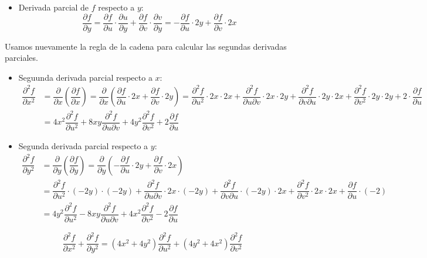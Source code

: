 \begin{enumerate}[label=\color{red}\textbf{\arabic*)}, leftmargin=*]
\begin{itemize}
	\item Derivada parcial de $f$ respecto a $y$: \[ \dfrac{\partial f}{\partial y}=\dfrac{\partial f}{\partial u}\cdot\dfrac{\partial u}{\partial y}+\dfrac{\partial f}{\partial v}\cdot\dfrac{\partial v}{\partial y}=-\dfrac{\partial f}{\partial u}\cdot 2y+\dfrac{\partial f}{\partial v}\cdot 2x \]
	\end{itemize}
	Usamos nuevamente la regla de la cadena para calcular las segundas derivadas parciales.
	\begin{itemize}
	\item Seguunda derivada parcial respecto a $x$: \[ \begin{aligned}
	\dfrac{\partial^2 f}{\partial x^2}&=\dfrac{\partial }{\partial x}\left(\dfrac{\partial f}{\partial x}\right) =\dfrac{\partial }{\partial x}\left(\dfrac{\partial f}{\partial u}\cdot 2x+\dfrac{\partial f}{\partial v}\cdot 2y\right)=\dfrac{\partial^2 f}{\partial u^2}\cdot 2x\cdot 2x+\dfrac{\partial ^2f}{\partial u\partial v}\cdot 2x\cdot 2y+\dfrac{\partial^2 f}{\partial v\partial u}\cdot 2y\cdot 2x+\dfrac{\partial^2 f}{\partial v^2}\cdot 2y\cdot 2y+2\cdot\dfrac{\partial f}{\partial u}\\
	&=4x^2\dfrac{\partial^2 f}{\partial u^2}+8xy\dfrac{\partial^2 f}{\partial u\partial v}+4y^2\dfrac{\partial^2 f}{\partial v^2}+2\dfrac{\partial f}{\partial u}
	\end{aligned}\]
	\item Segunda derivada parcial respecto a $y$: \[  \begin{aligned}
	\dfrac{\partial^2 f}{\partial y^2}&=\dfrac{\partial }{\partial y}\left(\dfrac{\partial f}{\partial y}\right)=\dfrac{\partial}{\partial y}\left(-\dfrac{ \partial f}{\partial u}\cdot 2y+\dfrac{\partial f}{\partial v}\cdot 2x\right)\\
	&=\dfrac{\partial^2 f}{\partial u^2}\cdot(-2y)\cdot(-2y)+\dfrac{\partial ^2f}{\partial u\partial v}\cdot 2x\cdot (-2y)+\dfrac{\partial^2 f}{\partial v\partial u}\cdot (-2y)\cdot 2x+\dfrac{\partial^2 f}{\partial v^2}\cdot 2x\cdot 2x+\dfrac{\partial f}{\partial u}\cdot(-2)\\
	&=4y^2\dfrac{\partial^2f}{\partial u^2}-8xy\dfrac{\partial^2 f}{\partial u\partial v}+4x^2\dfrac{\partial^2 f}{\partial v^2}-2\dfrac{\partial f}{\partial u}
	\end{aligned}\]
	\end{itemize}
	
$$\dfrac{\partial^2 f}{\partial x^2}+\dfrac{\partial^2 f}{\partial y^2}=(4x^2+4y^2)\dfrac{\partial^2 f}{\partial u^2}+(4y^2+4x^2)\dfrac{\partial^2 f}{\partial v^2}$$


\end{enumerate}
